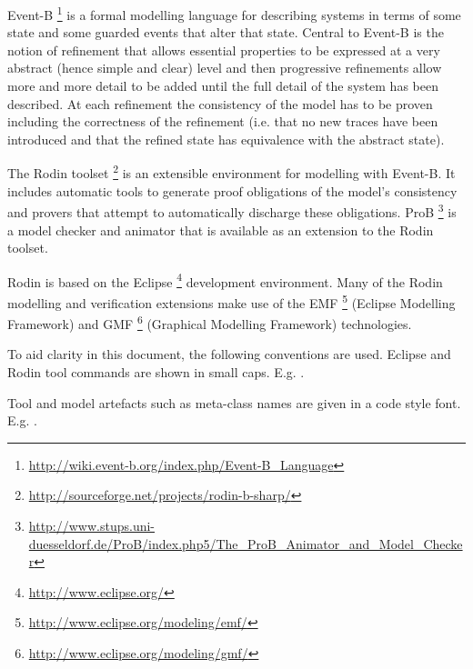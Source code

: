 Event-B%
\footnote{%
  \url{http://wiki.event-b.org/index.php/Event-B_Language}
} %
is a formal modelling language for describing systems in terms of some state and some guarded events that alter that state. Central to Event-B is the notion of refinement that allows essential properties to be expressed at a very abstract (hence simple and clear) level and then progressive refinements allow more and more detail to be added until the full detail of the system has been described. At each refinement the consistency of the model has to be proven including the correctness of the refinement (i.e. that no new traces have been introduced and that the refined state has equivalence with the abstract state).

The Rodin toolset%
\footnote{%
  \url{http://sourceforge.net/projects/rodin-b-sharp/}
} %
is an extensible environment for modelling with Event-B. It includes automatic tools to generate proof obligations of the model’s consistency and provers that attempt to automatically discharge these obligations. ProB%
\footnote{%
  \url{http://www.stups.uni-duesseldorf.de/ProB/index.php5/The_ProB_Animator_and_Model_Checker}
} %
is a model checker and animator that is available as an extension to the Rodin toolset.

Rodin is based on the Eclipse%
\footnote{%
  \url{http://www.eclipse.org/}
} %
development environment. Many of the Rodin modelling and verification extensions make use of the EMF%
\footnote{%
  \url{http://www.eclipse.org/modeling/emf/}
} %
(Eclipse Modelling Framework) and GMF%
\footnote{%
  \url{http://www.eclipse.org/modeling/gmf/}
} %
(Graphical Modelling Framework) technologies.

To aid clarity in this document, the following conventions are used. Eclipse and Rodin tool commands are shown in small caps. E.g. .

Tool and model artefacts such as meta-class names are given in a code style font. E.g. .

